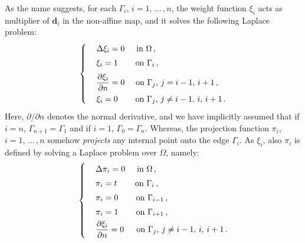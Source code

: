 \documentclass[12pt, a4paper, twoside, openright]{report}
\numberwithin{equation}{chapter}
\theoremstyle{theorem}
\theoremstyle{definition}
\theoremstyle{remark}
\theoremstyle{proposition}
\numberwithin{figure}{chapter}
\newcommand{\bg}[1]{\boldsymbol{#1}}
\begin{document}
		As the name suggests, for each $\Gamma_i$, $i = 1, \, \ldots \, , n$, the weight function $\xi_i$ acts as multiplier of $\bg{d}_i$ in the non-affine map, and it solves the following Laplace problem:
		\begin{equation}
			\label{eq:laplace-problem-weight-function}
			\begin{cases}
				& \Delta \xi_i = 0 \hspace*{0.5cm} \text{in $\Omega$} \, , \\[0.1cm]
				& \xi_i = 1 \hspace*{0.755cm} \text{on $\Gamma_i$} \, , \\[0.2cm]
				& \dfrac{\partial \xi_i}{\partial n} = 0 \hspace*{0.475cm} \text{on $\Gamma_j$, $j = i-1, \, i+1$} \, , \\[0.2cm]
				& \xi_i = 0 \hspace*{0.755cm} \text{on $\Gamma_j$, $j \neq i-1, \, i, \, i+1$} \, .
			\end{cases}
		\end{equation}
		Here, $\partial / \partial n$ denotes the normal derivative, and we have implicitly assumed that if $i = n$, $\Gamma_{n+1} = \Gamma_1$ and if $i = 1$, $\Gamma_0 = \Gamma_n$. Whereas, the projection function $\pi_i$, $i = 1, \, \ldots \, , n$ somehow \emph{projects} any internal point onto the edge $\Gamma_i$. As $\xi_i$, also $\pi_i$ is defined by solving a Laplace problem over $\Omega$, namely:
		\begin{equation}
			\label{eq:laplace-problem-projection-function}
			\begin{cases}
				& \Delta \pi_i = 0 \hspace*{0.5cm} \text{in $\Omega$} \, , \\[0.1cm]
				& \pi_i = t \hspace*{0.76cm} \text{on $\Gamma_i$} \, , \\[0.1cm]
				& \pi_i = 0 \hspace*{0.755cm} \text{on $\Gamma_{i-1}$} \, , \\[0.1cm]
				& \pi_i = 1 \hspace*{0.755cm} \text{on $\Gamma_{i+1}$} \, , \\[0.1cm]
				& \dfrac{\partial \xi_i}{\partial n} = 0 \hspace*{0.53cm} \text{on $\Gamma_j$, $j \neq i-1, \, i, \, i+1$} \, .
			\end{cases}
		\end{equation}
\end{document}
